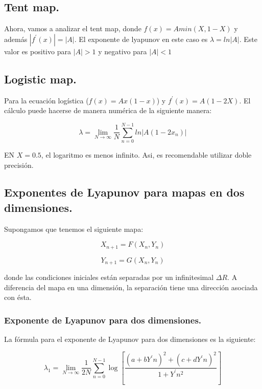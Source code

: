 \documentclass[prodmode,acmtap]{acmlarge}
\begin{document}
\subsection{Tent map.}
 
Ahora, vamos a analizar el tent map, donde $f(x)= A min(X, 1-X)$  y además $|f^{'}(x)|= |A|$. El exponente de lyapunov en este caso es $\lambda = ln|A|$. Este valor es positivo para $|A|>1$ y negativo para $|A|<1$


\subsection{Logistic map.}
Para la ecuación logística ($f(x)= Ax(1-x)$) y $f^{'}(x)= A(1-2X)$. El cálculo puede hacerse de manera numérica de la siguiente manera:

\begin{equation}
\lambda = \lim_{N \rightarrow \infty }\frac{1}{N} \sum_{n=0}^{N-1} ln|A(1-2x_{n})| 
\end{equation}

EN $X= 0.5$, el logaritmo es menos infinito. Asi, es recomendable utilizar doble precisión. 

\subsection{Exponentes de Lyapunov para mapas en dos dimensiones.}
Supongamos que tenemos el siguiente mapa:

\begin{equation}
X_{n+1} =F(X_{n}, Y_{n})
\end{equation}

\begin{equation}
Y_{n+1} =G(X_{n}, Y_{n})
\end{equation}

donde las condiciones iniciales están separadas por un infinitesimal $\Delta R$. A diferencia del mapa en una dimensión, la separación tiene una dirección asociada con ésta. 


\subsubsection{Exponente de Lyapunov para dos dimensiones.}

La fórmula para el exponente de Lyapunov para dos dimensiones es la siguiente:

\begin{equation}
\lambda_{1}= \lim_{N \rightarrow \infty}\frac{1}{2N} \sum_{n=0}^{N-1}\log \left[ \frac{(a+bY^{'}n)^{2} + (c+dY^{'}n)^{2}  }{1+Y^{'}n^{2}}  \right]
\end{equation}
\end{document}
